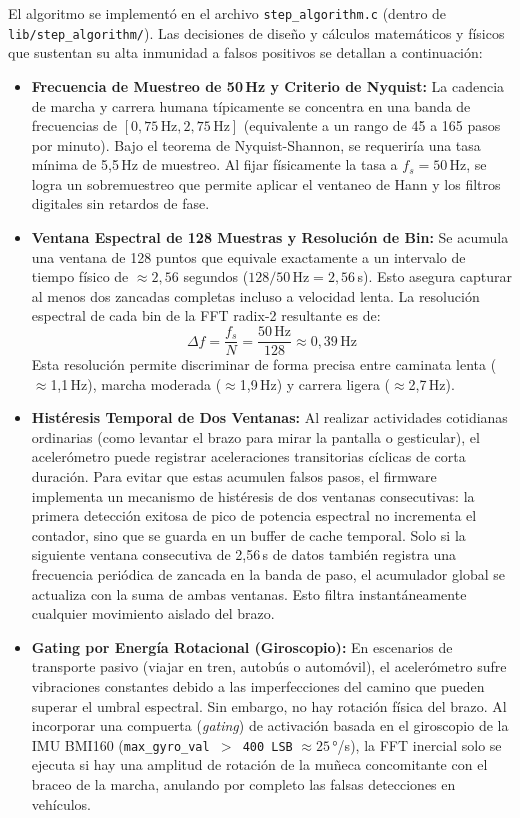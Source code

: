 \documentclass[letterpaper,11pt]{article}
\begin{document}
El algoritmo se implementó en el archivo \texttt{step\_algorithm.c} (dentro de \texttt{lib/step\_algorithm/}). Las decisiones de diseño y cálculos matemáticos y físicos que sustentan su alta inmunidad a falsos positivos se detallan a continuación:
\begin{itemize}
    \item \textbf{Frecuencia de Muestreo de 50\,Hz y Criterio de Nyquist:} La cadencia de marcha y carrera humana típicamente se concentra en una banda de frecuencias de $[0,75\,\text{Hz}, 2,75\,\text{Hz}]$ (equivalente a un rango de 45 a 165 pasos por minuto). Bajo el teorema de Nyquist-Shannon, se requeriría una tasa mínima de 5,5\,Hz de muestreo. Al fijar físicamente la tasa a $f_s = 50$\,Hz, se logra un sobremuestreo que permite aplicar el ventaneo de Hann y los filtros digitales sin retardos de fase.
    \item \textbf{Ventana Espectral de 128 Muestras y Resolución de Bin:} Se acumula una ventana de 128 puntos que equivale exactamente a un intervalo de tiempo físico de $\approx 2,56$ segundos ($128 / 50\,\text{Hz} = 2,56$\,s). Esto asegura capturar al menos dos zancadas completas incluso a velocidad lenta. La resolución espectral de cada bin de la FFT radix-2 resultante es de:
    $$\Delta f = \frac{f_s}{N} = \frac{50\,\text{Hz}}{128} \approx 0,39\,\text{Hz}$$
    Esta resolución permite discriminar de forma precisa entre caminata lenta ($\approx$1,1\,Hz), marcha moderada ($\approx$1,9\,Hz) y carrera ligera ($\approx$2,7\,Hz).
    \item \textbf{Histéresis Temporal de Dos Ventanas:} Al realizar actividades cotidianas ordinarias (como levantar el brazo para mirar la pantalla o gesticular), el acelerómetro puede registrar aceleraciones transitorias cíclicas de corta duración. Para evitar que estas acumulen falsos pasos, el firmware implementa un mecanismo de histéresis de dos ventanas consecutivas: la primera detección exitosa de pico de potencia espectral no incrementa el contador, sino que se guarda en un buffer de cache temporal. Solo si la siguiente ventana consecutiva de 2,56\,s de datos también registra una frecuencia periódica de zancada en la banda de paso, el acumulador global se actualiza con la suma de ambas ventanas. Esto filtra instantáneamente cualquier movimiento aislado del brazo.
    \item \textbf{Gating por Energía Rotacional (Giroscopio):} En escenarios de transporte pasivo (viajar en tren, autobús o automóvil), el acelerómetro sufre vibraciones constantes debido a las imperfecciones del camino que pueden superar el umbral espectral. Sin embargo, no hay rotación física del brazo. Al incorporar una compuerta (\textit{gating}) de activación basada en el giroscopio de la IMU BMI160 (\texttt{max\_gyro\_val $>$ 400 LSB} $\approx 25$\,°/s), la FFT inercial solo se ejecuta si hay una amplitud de rotación de la muñeca concomitante con el braceo de la marcha, anulando por completo las falsas detecciones en vehículos.
\end{itemize}
\end{document}
